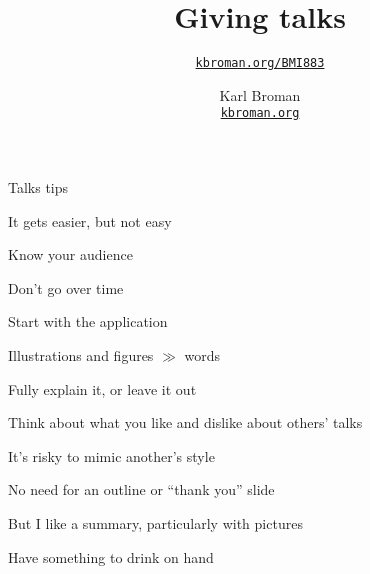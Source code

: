 \documentclass[aspectratio=169,12pt,t]{beamer}
\title{Giving talks}
\subtitle{}
\author{\href{https://kbroman.org/BMI883}{\tt kbroman.org/BMI883} }
\institute{}
\date{\small \hspace{3in} Karl Broman \\
  \hspace{3in} \href{https://kbroman.org}{\color{foreground}
    \small \tt kbroman.org}}
\begin{document}
{

\begin{frame}{Talks tips}

  \bi
\item It gets easier, but not easy
\item Know your audience
\item Don't go over time
\item Start with the application
\item Illustrations and figures $\gg$ words
\item Fully explain it, or leave it out
\item Think about what you like and dislike about others' talks
\item It's risky to mimic another's style
\item No need for an outline or ``thank you'' slide
  \bi
\item But I like a summary, particularly with pictures
  \ei
\item Have something to drink on hand
  \ei

\end{frame}
}
\end{document}
